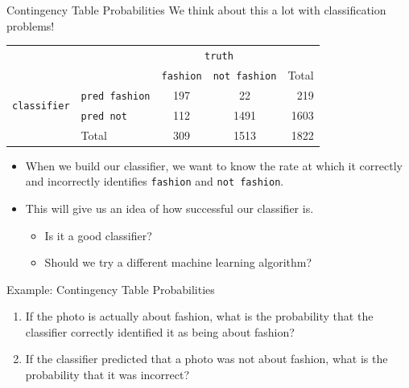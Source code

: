 \begin{frame}{Contingency Table Probabilities}
    We think about this a lot with classification problems! 
    \begin{center}
        \begin{tabular}{r l cc r}
		& & \multicolumn{2}{c}{{\texttt{truth}}} & \\
        \cline{3-4}
		& & \texttt{fashion} & \texttt{not fashion} & Total  \\ 
        \cline{2-5}
        \multirow{2}{*}{{\texttt{classifier}}} 
        & \texttt{pred fashion}   & 197 & 22 & 219 \\ 
  		& \texttt{pred not}       & 112 & 1491 & 1603 \\ 
        \cline{2-5}
  		& Total	& 309 & 1513 & 1822 \\
        \cline{2-5}
    \end{tabular}
    \end{center}
    \begin{itemize}
        \item When we build our classifier, we want to know the rate at which it correctly and incorrectly identifies \texttt{fashion} and \texttt{not fashion}.
        \item This will give us an idea of how successful our classifier is.
        \begin{itemize}
            \item Is it a good classifier?
            \item Should we try a different machine learning algorithm?
        \end{itemize}
    \end{itemize}
\end{frame}

\begin{frame}{Example: Contingency Table Probabilities}
    \begin{enumerate}
        \item If the photo is actually about fashion, what is the probability that the classifier correctly identified it as being about fashion?
        \item If the classifier predicted that a photo was not about fashion, what is the probability that it was incorrect?
    \end{enumerate}
\end{frame}

